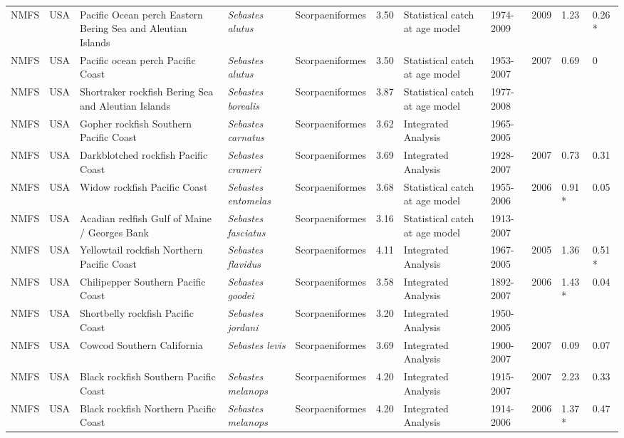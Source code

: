 \begin{longtable}{p{1.5cm}p{1.5cm}p{3cm}p{3cm}p{2.5cm}p{0.9cm}p{1.4cm}p{0.9cm}p{0.9cm}p{0.9cm}p{1cm}}
  NMFS & USA & Pacific Ocean perch Eastern Bering Sea and Aleutian Islands & \textit{Sebastes alutus} & Scorpaeniformes & 3.50 & Statistical catch at age model & 1974-2009 & 2009 & 1.23 & 0.26 * \\ 
  NMFS & USA & Pacific ocean perch Pacific Coast & \textit{Sebastes alutus} & Scorpaeniformes & 3.50 & Statistical catch at age model & 1953-2007 & 2007 & 0.69 & 0 \\ 
  NMFS & USA & Shortraker rockfish Bering Sea and Aleutian Islands & \textit{Sebastes borealis} & Scorpaeniformes & 3.87 & Statistical catch at age model & 1977-2008 &  &  &  \\ 
  NMFS & USA & Gopher rockfish Southern Pacific Coast & \textit{Sebastes carnatus} & Scorpaeniformes & 3.62 & Integrated Analysis & 1965-2005 &  &  &  \\ 
  NMFS & USA & Darkblotched rockfish Pacific Coast & \textit{Sebastes crameri} & Scorpaeniformes & 3.69 & Integrated Analysis & 1928-2007 & 2007 & 0.73 & 0.31 \\ 
  NMFS & USA & Widow rockfish Pacific Coast & \textit{Sebastes entomelas} & Scorpaeniformes & 3.68 & Statistical catch at age model & 1955-2006 & 2006 & 0.91 * & 0.05 \\ 
  NMFS & USA & Acadian redfish Gulf of Maine / Georges Bank & \textit{Sebastes fasciatus} & Scorpaeniformes & 3.16 & Statistical catch at age model & 1913-2007 &  &  &  \\ 
  NMFS & USA & Yellowtail rockfish Northern Pacific Coast & \textit{Sebastes flavidus} & Scorpaeniformes & 4.11 & Integrated Analysis & 1967-2005 & 2005 & 1.36 & 0.51 * \\ 
  NMFS & USA & Chilipepper Southern Pacific Coast & \textit{Sebastes goodei} & Scorpaeniformes & 3.58 & Integrated Analysis & 1892-2007 & 2006 & 1.43 * & 0.04 \\ 
  NMFS & USA & Shortbelly rockfish Pacific Coast & \textit{Sebastes jordani} & Scorpaeniformes & 3.20 & Integrated Analysis & 1950-2005 &  &  &  \\ 
  NMFS & USA & Cowcod Southern California & \textit{Sebastes levis} & Scorpaeniformes & 3.69 & Integrated Analysis & 1900-2007 & 2007 & 0.09 & 0.07 \\ 
  NMFS & USA & Black rockfish Southern Pacific Coast & \textit{Sebastes melanops} & Scorpaeniformes & 4.20 & Integrated Analysis & 1915-2007 & 2007 & 2.23 & 0.33 \\ 
  NMFS & USA & Black rockfish Northern Pacific Coast & \textit{Sebastes melanops} & Scorpaeniformes & 4.20 & Integrated Analysis & 1914-2006 & 2006 & 1.37 * & 0.47 \\ 

\end{longtable}
